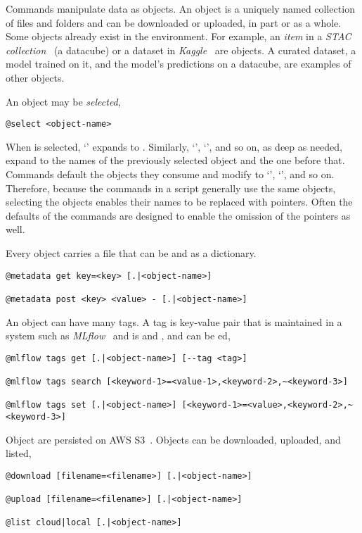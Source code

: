 Commands manipulate data as objects. An object is a uniquely named collection of files and folders and can be downloaded or uploaded, in part or as a whole. Some objects already exist in the environment. For example, an \emph{item} in a \emph{STAC collection}~\cite{stac_intro_tutorial} (a datacube) or a dataset in \emph{Kaggle}~\cite{chen2019-AIRD-dataset} are objects. A curated dataset, a model trained on it, and the model's predictions on a datacube, are examples of other objects.

An object may be \emph{selected},
%
\begin{graybox}
\begin{verbatim}
@select <object-name>
\end{verbatim}
\end{graybox}
%
When  is selected,  `' expands to . Similarly, `', `', and so on, as deep as needed, expand to the names of the previously selected object and the one before that. Commands default the objects they consume and modify to `', `', and so on. Therefore, because the commands in a script generally use the same objects, selecting the objects enables their names to be replaced with pointers. Often the defaults of the commands are designed to enable the omission of the pointers as well.

Every object carries a  file that can be  and  as a dictionary.
%
\begin{graybox}
\begin{verbatim}
@metadata get key=<key> [.|<object-name>]

@metadata post <key> <value> - [.|<object-name>]
\end{verbatim}
\end{graybox}

An object can have many tags. A tag is key-value pair that is maintained in a system such as \emph{MLflow}~\cite{mlflow} and is  and , and can be ed,
%
\begin{graybox}
\begin{verbatim}
@mlflow tags get [.|<object-name>] [--tag <tag>]

@mlflow tags search [<keyword-1>=<value-1>,<keyword-2>,~<keyword-3>]

@mlflow tags set [.|<object-name>] [<keyword-1>=<value>,<keyword-2>,~<keyword-3>]
\end{verbatim}
\end{graybox}

Object are persisted on AWS S3~\cite{aws_s3}. Objects can be downloaded, uploaded, and listed,
%
\begin{graybox}
\begin{verbatim}
@download [filename=<filename>] [.|<object-name>]

@upload [filename=<filename>] [.|<object-name>]
    
@list cloud|local [.|<object-name>]
\end{verbatim}
\end{graybox}
